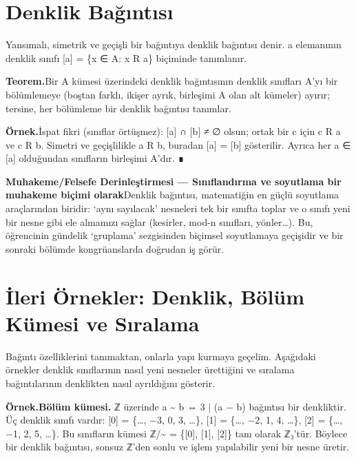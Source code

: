 \section{Denklik Bağıntısı}

Yansımalı, simetrik ve geçişli bir bağıntıya denklik bağıntısı denir. a elemanının denklik sınıfı [a] = \{x ∈ A: x R a\} biçiminde tanımlanır.

\begin{tcolorbox}[bookbox,colback=cDef]\textbf{\textsf{\textcolor{cAcc}{Teorem.}}}\quad Bir A kümesi üzerindeki denklik bağıntısının denklik sınıfları A’yı bir bölümlemeye (boştan farklı, ikişer ayrık, birleşimi A olan alt kümeler) ayırır; tersine, her bölümleme bir denklik bağıntısı tanımlar.\end{tcolorbox}

\begin{tcolorbox}[bookbox,colback=cEx]\textbf{\textsf{\textcolor{cAcc}{Örnek.}}}\quad İspat fikri (sınıflar örtüşmez): [a] ∩ [b] ≠ ∅ olsun; ortak bir c için c R a ve c R b. Simetri ve geçişlilikle a R b, buradan [a] = [b] gösterilir. Ayrıca her a ∈ [a] olduğundan sınıfların birleşimi A’dır. ∎\end{tcolorbox}

\begin{tcolorbox}[bookbox,colback=cDep]\textbf{\textsf{\textcolor{cAcc}{Muhakeme/Felsefe Derinleştirmesi — Sınıflandırma ve soyutlama bir muhakeme biçimi olarak}}}\quad Denklik bağıntısı, matematiğin en güçlü soyutlama araçlarından biridir: ‘aynı sayılacak’ nesneleri tek bir sınıfta toplar ve o sınıfı yeni bir nesne gibi ele almamızı sağlar (kesirler, mod-n sınıfları, yönler…). Bu, öğrencinin gündelik ‘gruplama’ sezgisinden biçimsel soyutlamaya geçişidir ve bir sonraki bölümde kongrüanslarda doğrudan iş görür.\end{tcolorbox}

\section{İleri Örnekler: Denklik, Bölüm Kümesi ve Sıralama}

Bağıntı özelliklerini tanımaktan, onlarla yapı kurmaya geçelim. Aşağıdaki örnekler denklik sınıflarının nasıl yeni nesneler ürettiğini ve sıralama bağıntılarının denklikten nasıl ayrıldığını gösterir.

\begin{tcolorbox}[bookbox,colback=cEx]\textbf{\textsf{\textcolor{cAcc}{Örnek.}}}\quad \textbf{Bölüm kümesi. }ℤ üzerinde a \textasciitilde{} b ⇔ 3 | (a − b) bağıntısı bir denkliktir. Üç denklik sınıfı vardır: [0] = \{…, −3, 0, 3, …\}, [1] = \{…, −2, 1, 4, …\}, [2] = \{…, −1, 2, 5, …\}. Bu sınıfların kümesi ℤ/\textasciitilde{} = \{[0], [1], [2]\} tam olarak ℤ₃’tür. Böylece bir denklik bağıntısı, sonsuz ℤ’den sonlu ve işlem yapılabilir yeni bir nesne üretir.\end{tcolorbox}

